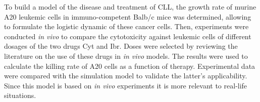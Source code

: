To build a model of the disease and treatment of CLL, the growth rate of murine A20 leukemic cells in immuno-competent Balb/c mice was determined, allowing to formulate the logistic dynamic of these cancer cells. 
Then, experiments were conducted \textit{in vivo} to compare the cytotoxicity against leukemic cells of different dosages of the two drugs Cyt and Ibr. Doses were selected by reviewing the literature on the use of these drugs in \textit{in vivo} models. The results were used to calculate the killing rate of A20 cells as a function of therapy. 
Experimental data were compared with the simulation model to validate the latter’s applicability. Since this model is based on \textit{in vivo} experiments it is more relevant to real-life situations.


